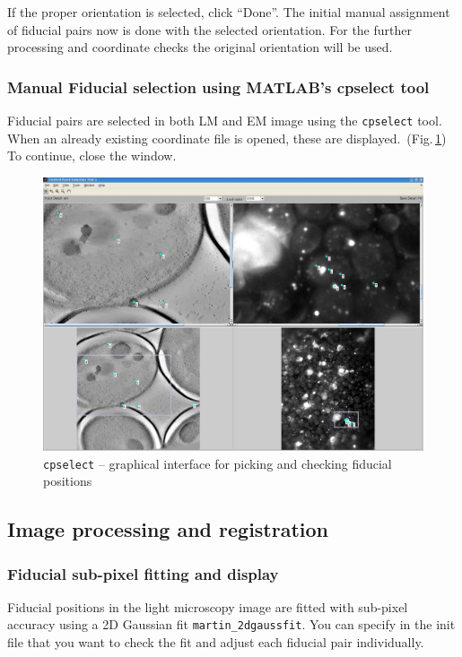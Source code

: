 \documentclass[10pt,a4paper,onepage,DIV12]{scrartcl}
\begin{document}
If the proper orientation is selected, click ``Done''. The initial manual assignment of fiducial pairs now is done with the selected orientation. For the further processing and coordinate checks the original orientation will be used.


\subsubsection{Manual Fiducial selection using MATLAB's cpselect tool}
\label{sec:fiducials}

Fiducial pairs are selected in both LM and EM image using the \texttt{cpselect} tool. When an already existing coordinate file is opened, these are displayed.\, (Fig.\,\ref{fig:cpsel_fid1}) To continue, close the window.

\begin{figure}[ht!]
 \centering
 \includegraphics[width=.92\textwidth]{images/cpsel_fid1.jpg}
 \caption{\texttt{cpselect} -- graphical interface for picking and checking fiducial positions}
 \label{fig:cpsel_fid1}
\end{figure}

\newpage
\subsection{Image processing and registration}

\subsubsection{Fiducial sub-pixel fitting and display}
\label{sec:gaussfit}
Fiducial positions in the light microscopy image are fitted with sub-pixel accuracy using a  2D Gaussian fit \texttt{martin\_2dgaussfit}.
You can specify in the init file that you want to check the fit and adjust each fiducial pair individually.
\end{document}
